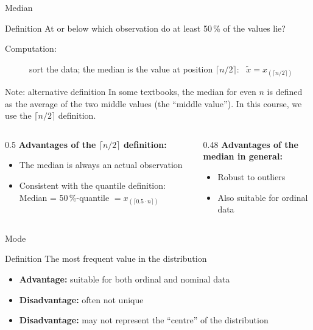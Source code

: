 \documentclass[aspectratio=169,11pt]{beamer}
\begin{document}
\begin{frame}{Median}
  \begin{block}{Definition}
    At or below which observation do at least 50\,\% of the values lie?
  \end{block}

  \begin{description}
    \item[Computation:] sort the data; the median is the value at position $\lceil n/2 \rceil$:
      \ $\tilde{x} = x_{(\lceil n/2 \rceil)}$
  \end{description}

  \begin{alertblock}{Note: alternative definition}
    In some textbooks, the median for even $n$ is defined as the average of the two
    middle values (the ``middle value''). In this course, we use the $\lceil n/2 \rceil$ definition.
  \end{alertblock}

  \begin{columns}[T]
    \begin{column}{0.5\textwidth}
      \textbf{Advantages of the $\lceil n/2 \rceil$ definition:}
      \begin{itemize}
        \item The median is always an actual observation
        \item Consistent with the quantile definition:
              Median = 50\,\%-quantile $= x_{(\lceil 0.5 \cdot n \rceil)}$
      \end{itemize}
    \end{column}
    \begin{column}{0.48\textwidth}
      \textbf{Advantages of the median in general:}
      \begin{itemize}
        \item Robust to outliers
        \item Also suitable for ordinal data
      \end{itemize}
    \end{column}
  \end{columns}
\end{frame}

\begin{frame}{Mode}
  \begin{block}{Definition}
    The most frequent value in the distribution
  \end{block}

  \begin{itemize}
    \item \textbf{Advantage:} suitable for both ordinal and nominal data
    \item \textbf{Disadvantage:} often not unique
    \item \textbf{Disadvantage:} may not represent the ``centre'' of the distribution
  \end{itemize}
\end{frame}
\end{document}
